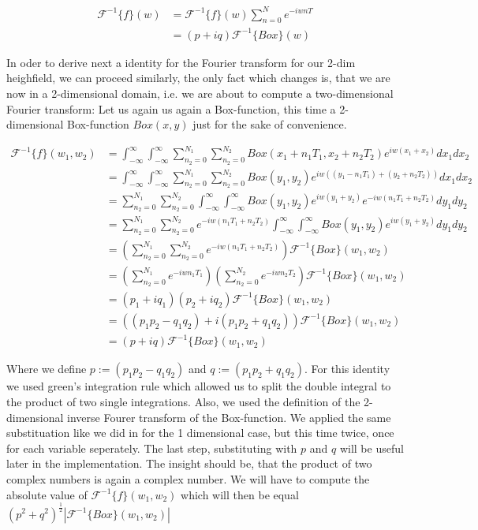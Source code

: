 \begin{align*}
\mathcal{F}^{-1}\{f\}(w)
& =\mathcal{F}^{-1}\{f\}(w) \sum_{n=0}^{N} e^{-iwnT} \\
& = (p+iq) \mathcal{F}^{-1}\{Box\}(w)  
\end{align*}

In oder to derive next a identity for the Fourier transform for our 2-dim heighfield, we can proceed similarly, the only fact which changes is, that we are now in a 2-dimensional domain, i.e. we are about to compute a two-dimensional Fourier transform:
Let us again us again a Box-function, this time a 2-dimensional Box-function $Box(x,y)$ just for the sake of convenience.

\begin{align*}
\mathcal{F}^{-1}\{f\}(w_1,w_2)
& = \int_{-\infty}^{\infty}\int_{-\infty}^{\infty} \sum_{n_2=0}^{N_1} \sum_{n_2=0}^{N_2} Box(x_1 + n_1 T_1, x_2 + n_2 T_2) e^{iw(x_1 + x_2)}dx_1 dx_2 \\
& = \int_{-\infty}^{\infty}\int_{-\infty}^{\infty} \sum_{n_2=0}^{N_1} \sum_{n_2=0}^{N_2} Box(y_1, y_2) e^{iw((y_1 - n_1 T_1) + (y_2 + n_2 T_2))}dx_1 dx_2 \\
& =\sum_{n_2=0}^{N_1} \sum_{n_2=0}^{N_2} \int_{-\infty}^{\infty}\int_{-\infty}^{\infty} Box(y_1, y_2) e^{iw(y_1 + y_2)} e^{-iw(n_1 T_1 + n_2 T_2)}dy_1 dy_2 \\
& =\sum_{n_2=0}^{N_1} \sum_{n_2=0}^{N_2} e^{-iw(n_1 T_1 + n_2 T_2)} \int_{-\infty}^{\infty}\int_{-\infty}^{\infty} Box(y_1, y_2) e^{iw(y_1 + y_2)} dy_1 dy_2 \\
& =\left(\sum_{n_2=0}^{N_1} \sum_{n_2=0}^{N_2} e^{-iw(n_1 T_1 + n_2 T_2)}\right) \mathcal{F}^{-1}\{Box\}(w_1,w_2) \\
& =\left(\sum_{n_2=0}^{N_1} e^{-iw n_1 T_1}\right) \left(\sum_{n_2=0}^{N_2} e^{-iw n_2 T_2}\right) \mathcal{F}^{-1}\{Box\}(w_1,w_2) \\
& =(p_1 + i q_1)(p_2 + i q_2) \mathcal{F}^{-1}\{Box\}(w_1,w_2) \\
& =((p_1 p_2 - q_1 q_2) + i(p_1 p_2 + q_1 q_2)) \mathcal{F}^{-1}\{Box\}(w_1,w_2) \\
& =(p + iq) \mathcal{F}^{-1}\{Box\}(w_1,w_2)
\end{align*}

Where we define $p := (p_1 p_2 - q_1 q_2) $ and $q := (p_1 p_2 + q_1 q_2)$. For this identity we used green's integration rule which allowed us to split the double integral to the product of two single integrations. Also, we used the definition of the 2-dimensional inverse Fourer transform of the Box-function. We applied the same substituation like we did in for the 1 dimensional case, but this time twice, once for each variable seperately. The last step, substituting with $p$ and $q$ will be useful later in the implementation. The insight should be, that the product of two complex numbers is again a complex number. We will have to compute the absolute value of $\mathcal{F}^{-1}\{f\}(w_1,w_2)$ which will then be equal $(p^2 + q^2)^{\frac{1}{2}}\left|\mathcal{F}^{-1}\{Box\}(w_1,w_2)\right|$

